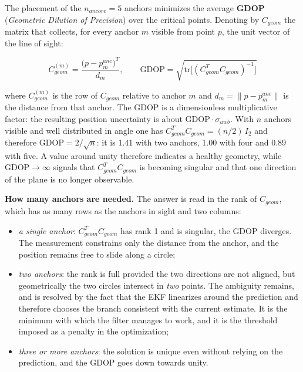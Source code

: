 \documentclass[conference,9pt]{IEEEtran}
\begin{document}
The placement of the $n_{ancore} = 5$ anchors minimizes the average
\textbf{GDOP} (\emph{Geometric Dilution of Precision}) over the critical
points. Denoting by $C_{geom}$ the matrix that collects, for every anchor $m$
visible from point $p$, the unit vector of the line of sight:

\begin{equation}
C_{geom}^{(m)} = \frac{\big(p - p^{anc}_m\big)^T}{d_m},
\qquad
\mathrm{GDOP} = \sqrt{\mathrm{tr}\big[(C_{geom}^T C_{geom})^{-1}\big]}
\label{eq:gdop}
\end{equation}

where $C_{geom}^{(m)}$ is the row of $C_{geom}$ relative to anchor $m$ and
$d_m = \lVert p - p^{anc}_m\rVert$ is the distance from that anchor. The
GDOP is a dimensionless multiplicative factor: the resulting position
uncertainty is about $\mathrm{GDOP}\cdot\sigma_{uwb}$. With $n$ anchors visible
and well distributed in angle one has $C_{geom}^T C_{geom} = (n/2)\,I_2$ and
therefore $\mathrm{GDOP} = 2/\sqrt{n}$: it is 1.41 with two anchors, 1.00 with
four and 0.89 with five. A value around unity therefore indicates a healthy
geometry, while $\mathrm{GDOP} \to \infty$ signals that $C_{geom}^T C_{geom}$
is becoming singular and that one direction of the plane is no longer
observable.

\textbf{How many anchors are needed.} The answer is read in the rank of
$C_{geom}$, which has as many rows as the anchors in sight and two columns:

\begin{itemize}
\item \emph{a single anchor}: $C_{geom}^T C_{geom}$ has rank 1 and is
      singular, the GDOP diverges. The measurement constrains only the distance
      from the anchor, and the position remains free to slide along a circle;
\item \emph{two anchors}: the rank is full provided the two directions are not
      aligned, but geometrically the two circles intersect in \emph{two}
      points. The ambiguity remains, and is resolved by the fact that the EKF
      linearizes around the prediction and therefore chooses the branch
      consistent with the current estimate. It is the minimum with which the
      filter manages to work, and it is the threshold imposed as a penalty in
      the optimization;
\item \emph{three or more anchors}: the solution is unique even without relying
      on the prediction, and the GDOP goes down towards unity.
\end{itemize}
\end{document}
